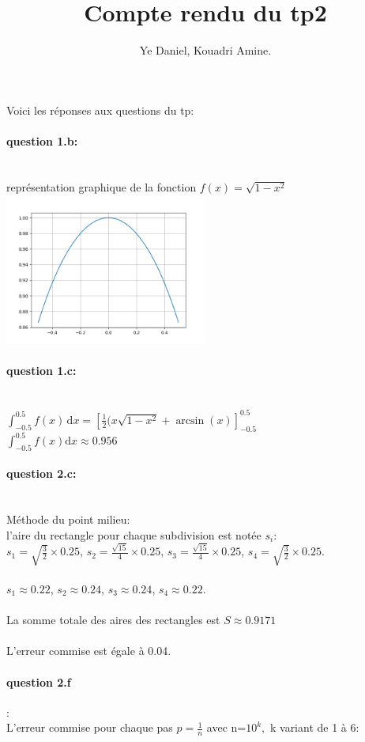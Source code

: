 \documentclass{article}
\author{Ye Daniel, Kouadri Amine.}
\title{Compte rendu du tp2}
\begin{document}
\maketitle
Voici les réponses aux questions du tp:

\paragraph{question 1.b:}
~~\\
représentation graphique de la fonction $f(x) = \sqrt{1 - x^2}$ \\
\includegraphics[height=5cm]{f.png}
\paragraph{question 1.c:}
~~\\
$\int_{-0.5}^{0.5} f(x) \, \mathrm dx= [\frac{1}{2}(x \sqrt{1-x^2}+\arcsin(x)]_{-0.5}^{0.5}$
\\
$\int_{-0.5}^{0.5}f(x)\mathrm dx\approx0.956$
\paragraph{question 2.c:}
~~\\
Méthode du point milieu:
\\
l'aire du rectangle pour chaque subdivision est notée $s_i$:
\\
$s_1=\sqrt{\frac{3}{2}}\times{0.25}$, 
$s_2=\frac{\sqrt{15}}{4}\times{0.25}$,
$s_3=\frac{\sqrt{15}}{4}\times{0.25}$,
$s_4=\sqrt{\frac{3}{2}}\times{0.25}$.
\\ 
\\
$s_1\approx0.22$,
$s_2\approx0.24$,
$s_3\approx0.24$,
$s_4\approx0.22$.
\\
\\
La somme totale des aires des rectangles est $S\approx0.9171$
\\ \\
L'erreur commise est égale à 0.04.
\\
\paragraph{question 2.f}:
~~\\
L'erreur commise pour chaque pas $p=\frac{1}{n}$ avec n=$10^k,$ k variant de 1 à 6:
\\
\end{document}
